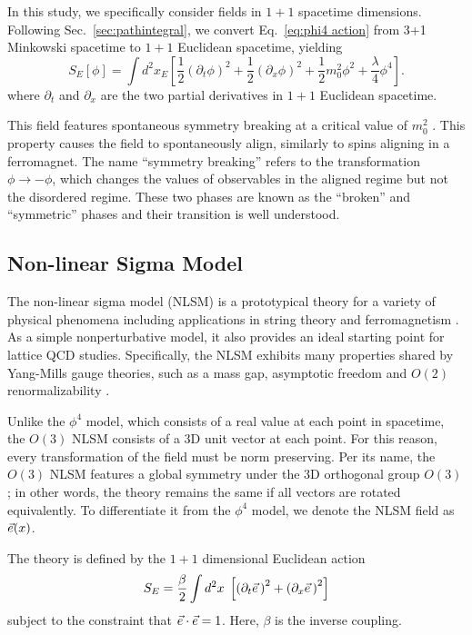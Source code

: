 In this study, we specifically consider fields in $1+1$ spacetime dimensions. Following Sec.~\ref{sec:pathintegral}, we convert Eq.~\ref{eq:phi4 action} from 3+1 Minkowski spacetime to $1+1$ Euclidean spacetime, yielding
\begin{equation}
    \label{eq:phi4 euclidean action}
    S_E[\phi] = \int d^2 x_E \left[\frac{1}{2}\left(\partial_t \phi\right)^2 + \frac{1}{2} \left(\partial_x \phi \right)^2 + \frac{1}{2} m_0^2 \phi^2 + \frac{\lambda}{4}\phi^4\right].
\end{equation}
where $\partial_t$ and $\partial_x$ are the two partial derivatives in $1+1$ Euclidean spacetime. 

This field features spontaneous symmetry breaking at a critical value of $m_0^2$ \cite{chang1976}. This property causes the field to spontaneously align, similarly to spins aligning in a ferromagnet. The name ``symmetry breaking'' refers to the transformation $\phi\rightarrow-\phi$, which changes the values of observables in the aligned regime but not the disordered regime. These two phases are known as the ``broken'' and ``symmetric'' phases and their transition is well understood.


\subsection{Non-linear Sigma Model}
The non-linear sigma model (NLSM) is a prototypical theory for a variety of physical phenomena including applications in string theory \cite{callan1985} and ferromagnetism \cite{polyakov1975}. As a simple nonperturbative model, it also provides an ideal starting point for lattice QCD studies. Specifically, the NLSM exhibits many properties shared by Yang-Mills gauge theories, such as a mass gap, asymptotic freedom and $O(2)$ renormalizability \cite{polyakov1975}. 

Unlike the $\phi^4$ model, which consists of a real value at each point in spacetime, the $O(3)$ NLSM consists of a 3D unit vector at each point. For this reason, every transformation of the field must be norm preserving. Per its name, the $O(3)$ NLSM features a global symmetry under the 3D orthogonal group $O(3)$; in other words, the theory remains the same if all vectors are rotated equivalently. To differentiate it from the $\phi^4$ model, we denote the NLSM field as $\vec e(x)$.

The theory is defined by the $1+1$ dimensional Euclidean action 
\begin{equation}
    \label{eq:nlsm euclidean action}
    S_E = \frac{\beta}{2} \int d^2x \; \left[ \left(\partial_t \vec e\, \right)^2+ \left( \partial_x \vec e\,\right)^2 \right]
\end{equation}
subject to the constraint that $\vec e\cdot\vec e = 1$. Here, $\beta$ is the inverse coupling.



